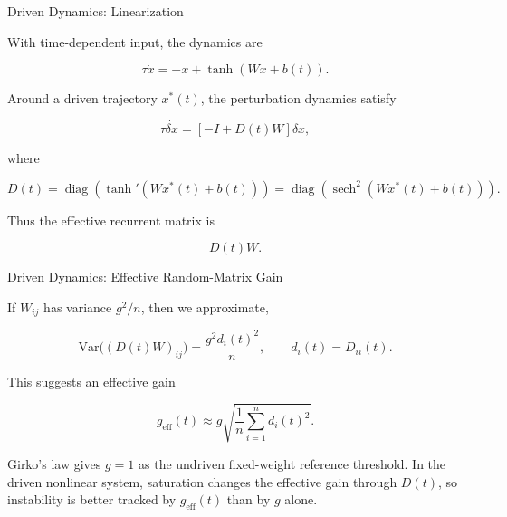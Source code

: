 \documentclass[
11pt,notheorems,hyperref={pdfauthor=whatever}
]{beamer}
\begin{document}
\begin{frame}{Driven Dynamics: Linearization}
\small

With time-dependent input, the dynamics are

\[
\tau \dot{x}
=
-x+\tanh(Wx+b(t)).
\]

Around a driven trajectory \(x^\ast(t)\), the perturbation dynamics satisfy

\[
\tau \dot{\delta x}
=
\left[-I+D(t)W\right]\delta x,
\]

where

\[
D(t)
=
\operatorname{diag}\left(
\tanh'(Wx^\ast(t)+b(t))
\right)
=
\operatorname{diag}\left(
\operatorname{sech}^2(Wx^\ast(t)+b(t))
\right).
\]

Thus the effective recurrent matrix is

\[
D(t)W.
\]

\end{frame}

\begin{frame}{Driven Dynamics: Effective Random-Matrix Gain}
\small

If \(W_{ij}\) has variance \(g^2/n\), then we approximate,

\[
\mathrm{Var}\big((D(t)W)_{ij}\big)
=
\frac{g^2 d_i(t)^2}{n},
\qquad
d_i(t)=D_{ii}(t).
\]

This suggests an effective gain

\[
g_{\mathrm{eff}}(t)
\approx
g
\sqrt{
\frac{1}{n}\sum_{i=1}^n d_i(t)^2
}.
\]

Girko's law gives \(g=1\) as the undriven fixed-weight reference threshold.
In the driven nonlinear system, saturation changes the effective gain through
\(D(t)\), so instability is better tracked by \(g_{\mathrm{eff}}(t)\) than by
\(g\) alone.

\end{frame}
\end{document}
